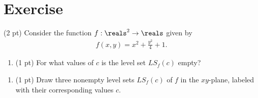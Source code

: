 \section{Exercise}

(2 pt) Consider the function $f: \reals^{2} \rightarrow \reals$ given by
\begin{align*}
f(x,y)
=
x^{2} + \frac{y^{2}}{4} + 1.
\end{align*}
\begin{enumerate}[label=(\alph*)]
\item (1 pt) For what values of $c$ is the level set $LS_{f}(c)$ empty? 
\end{enumerate}

\spaceSolution{.1in}{}

\begin{enumerate}[resume,label=(\alph*)]
\item (1 pt) Draw three nonempty level sets $LS_{f}(c)$ of $f$ in the $x y$-plane, labeled with their corresponding values $c$.
\end{enumerate}